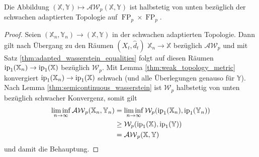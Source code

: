 \begin{lemma}\label{thm:weak_adapted_semicontinuity}
    Die Abbildung $(\mathbb{X,Y}) \mapsto \mathcal{AW}_p(\mathbb{X,Y})$ ist halbstetig von unten bezüglich der schwachen adaptierten Topologie auf $\operatorname{FP}_p\times \operatorname{FP}_p$.
\end{lemma}
\begin{proof}
    Seien $(\mathbb{X}_n, \mathbb{Y}_n) \rightarrow (\mathbb{X,Y})$ in der schwachen adaptierten Topologie. Dann gilt nach Übergang zu den Räumen $(X_t, \widehat{d}_t)$ $\mathbb{X}_n \rightarrow \mathbb{X}$ bezüglich $\mathcal{AW}_p$ und mit Satz \ref{thm:adapted_wasserstein_equalities} folgt auf diesen Räumen $\operatorname{ip}_1(\mathbb{X}_n) \rightarrow \operatorname{ip}_1(\mathbb{X})$ bezüglich $\mathcal{W}_p$. Mit Lemma \ref{thm:weak_topology_metric} konvergiert $\operatorname{ip}_1(\mathbb{X}_n) \rightarrow \operatorname{ip}_1(\mathbb{X})$ schwach (und alle Überlegungen genauso für $\mathbb{Y}$). Nach Lemma \ref{thm:semicontinuous_wasserstein} ist $\mathcal{W}_p$ halbstetig von unten bezüglich schwacher Konvergenz, somit gilt
    \begin{align*}
        \liminf_{n\rightarrow\infty} \mathcal{AW}_p(\mathbb{X}_n,\mathbb{Y}_n) &= \liminf_{n\rightarrow\infty} \mathcal{W}_p(\operatorname{ip}_1(\mathbb{X}_n), \operatorname{ip}_1(\mathbb{Y}_n)) \\
        &\geq \mathcal{W}_p(\operatorname{ip}_1(\mathbb{X}), \operatorname{ip}_1(\mathbb{Y})) \\
        &= \mathcal{AW}_p(\mathbb{X}, \mathbb{Y})
    \end{align*}
    und damit die Behauptung.
\end{proof}